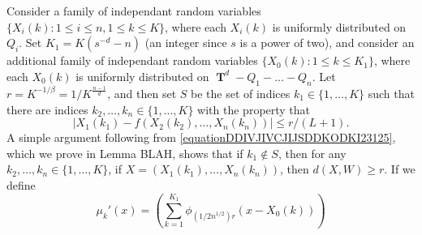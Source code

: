 \documentclass[12pt,reqno]{article}
\numberwithin{equation}{section}
\DeclareMathOperator{\TT}{\mathbf{T}}
\begin{document}
Consider a family of independant random variables $\{ X_i(k) : 1 \leq i \leq n, 1 \leq k \leq K \}$, where each $X_i(k)$ is uniformly distributed on $Q_i$. Set $K_1 = K(s^{-d} - n)$ (an integer since $s$ is a power of two), and consider an additional family of independant random variables $\{ X_0(k) : 1 \leq k \leq K_1 \}$, where each $X_0(k)$ is uniformly distributed on $\TT^d - Q_1 - \dots - Q_n$. Let $r = K^{-1/\beta} = 1/K^{\frac{n-1}{d}}$, and then set $S$ be the set of indices $k_1 \in \{ 1, \dots, K \}$ such that there are indices $k_2,\dots,k_n \in \{ 1,\dots,K \}$ with the property that
%
\begin{equation} \label{equationDDIVJIVCJIJSDDKODKI23125}
    |X_1(k_1) - f(X_2(k_2),\dots,X_n(k_n))| \leq r/(L+1).
\end{equation}
%
A simple argument following from \eqref{equationDDIVJIVCJIJSDDKODKI23125}, which we prove in Lemma BLAH, shows that if $k_1 \not \in S$, then for any $k_2,\dots,k_n \in \{ 1, \dots, K \}$, if $X = (X_1(k_1),\dots,X_n(k_n))$, then $d(X,W) \geq r$. If we define
%
\[ \mu_k'(x) = \left( \sum_{k = 1}^{K_1} \phi_{(1/2n^{1/2}) r}(x - X_0(k)) \right) \]
\end{document}
